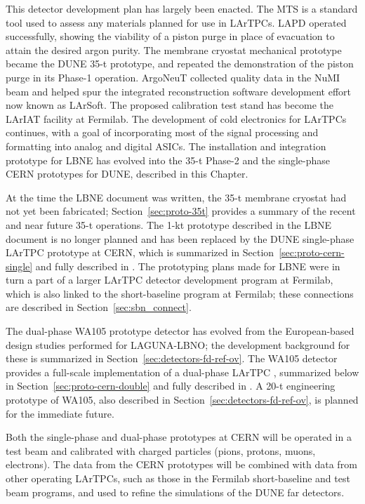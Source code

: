 This detector development plan has largely been enacted.  The MTS is a standard tool used to assess any materials planned for use in LArTPCs.  LAPD operated successfully, showing the viability of a piston purge in place of evacuation to attain the desired argon purity.  The membrane cryostat mechanical prototype became the DUNE 35-t prototype, and repeated the demonstration of the piston purge in its Phase-1 operation.  ArgoNeuT collected quality data in the NuMI beam and helped spur the integrated reconstruction software development effort now known as LArSoft.  The proposed calibration test stand has become the LArIAT facility at Fermilab.  The development of cold electronics for LArTPCs continues, with a goal of incorporating most of the signal processing and formatting into analog and digital ASICs.  The installation and integration prototype for LBNE has evolved into the 35-t Phase-2 and the single-phase CERN prototypes for DUNE, described in this Chapter.
 
At the time the LBNE document was written, the 35-t membrane cryostat had not yet been fabricated; Section~\ref{sec:proto-35t} provides a summary of the recent and near future 35-t operations.  The 1-kt prototype described in the LBNE document is no longer planned and has been replaced by the DUNE single-phase LArTPC prototype at CERN, which is summarized in Section~\ref{sec:proto-cern-single} and fully described in \anxcernproto.  The prototyping plans made for LBNE were in turn a part of a larger LArTPC detector development program at Fermilab, which is also linked to the short-baseline program at Fermilab; these connections are described in Section~\ref{sec:sbn_connect}.

The dual-phase WA105 prototype detector has evolved from the European-based design studies performed for LAGUNA-LBNO; the development background for these is summarized %
in Section~\ref{sec:detectors-fd-ref-ov}.  The WA105 detector provides a full-scale implementation of a dual-phase LArTPC , summarized below in Section~\ref{sec:proto-cern-double} and fully described in  \anxdualtdr.  A 20-t engineering prototype of WA105, also described in Section~\ref{sec:detectors-fd-ref-ov}, %
is planned for the immediate future.

Both the single-phase and dual-phase prototypes at CERN will be operated in a test beam and calibrated with charged particles (pions, protons, muons, electrons). The data from the CERN
prototypes will be combined with data from other operating LArTPCs, such as those in the Fermilab short-baseline and test beam programs, and used to refine the simulations of the DUNE far detectors.  

